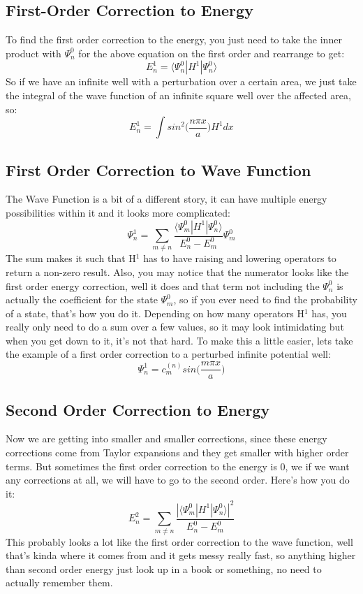 \documentclass[garamond]{article}
\begin{document}
\subsection{First-Order Correction to Energy}
To find the first order correction to the energy, you just need to take the inner product with $\Psi^0_n$ for the above equation on the first order and rearrange to get:
\begin{equation}
E^1_n=\langle\Psi^0_n|H^1|\Psi^0_n\rangle
\end{equation}
So if we have an infinite well with a perturbation over a certain area, we just take the integral of the wave function of an infinite square well over the affected area, so:
\begin{equation}
E^1_n=\int sin^2\Big(\frac{n\pi x}{a}\Big)H^1dx
\end{equation}

\subsection{First Order Correction to Wave Function}
The Wave Function is a bit of a different story, it can have multiple energy possibilities within it and it looks more complicated:
\begin{equation}
\Psi^1_n=\sum_{m\neq n} \frac{\langle \Psi^0_m|H^1|\Psi^0_n\rangle}{E^0_n-E^0_m}\Psi^0_m
\end{equation}
The sum makes it such that H$^1$ has to have raising and lowering operators to return a non-zero result. Also, you may notice that the numerator looks like the first order energy correction, well it does and that term not including the $\Psi^0_n$ is actually the coefficient for the state $\Psi^0_m$, so if you ever need to find the probability of a state, that's how you do it. Depending on how many operators H$^1$ has, you really only need to do a sum over a few values, so it may look intimidating but when you get down to it, it's not that hard. To make this a little easier, lets take the example of a first order correction to a perturbed infinite potential well:
\begin{equation}
\Psi^1_n=c^{(n)}_msin\Big(\frac{m\pi x}{a}\Big)
\end{equation} 

\subsection{Second Order Correction to Energy}
Now we are getting into smaller and smaller corrections, since these energy corrections come from Taylor expansions and they get smaller with higher order terms. But sometimes the first order correction to the energy is 0, we if we want any corrections at all, we will have to go to the second order. Here's how you do it:
\begin{equation}
E_n^2=\sum_{m\neq n} \frac{|\langle \Psi^0_m|H^1|\Psi^0_n\rangle|^2}{E^0_n-E^0_m}
\end{equation}
This probably looks a lot like the first order correction to the wave function, well that's kinda where it comes from and it gets messy really fast, so anything higher than second order energy just look up in a book or something, no need to actually remember them.
\end{document}
